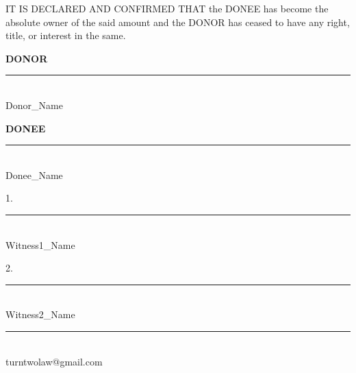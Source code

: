 \documentclass[12pt]{article}
\begin{document}
\vspace{0.7em}
\noindent
{\large IT IS DECLARED AND CONFIRMED THAT the DONEE has become the absolute owner of the said amount and the DONOR has ceased to have any right, title, or interest in the same.}

\vspace{0.9em}

\vspace{1.8em}
\noindent
\begin{minipage}[t]{0.45\textwidth}
  {\large\bfseries DONOR}\\[2.0em]
  \rule{6cm}{0.8pt}\\
  {\large {{Donor_Name}}}
\end{minipage}
\hfill
\begin{minipage}[t]{0.45\textwidth}
  {\large\bfseries DONEE}\\[2.0em]
  \rule{6cm}{0.8pt}\\
  {\large {{Donee_Name}}}
\end{minipage}

\vspace{1.4em}

\vspace{0.5em}
\noindent
\begin{minipage}[t]{0.45\textwidth}
  {\large 1.}\\[1.8em]
  \rule{6cm}{0.8pt}\\
  {\large {{Witness1_Name}}}
\end{minipage}
\hfill
\begin{minipage}[t]{0.45\textwidth}
  {\large 2.}\\[1.8em]
  \rule{6cm}{0.8pt}\\
  {\large {{Witness2_Name}}}
\end{minipage}

\vfill
\noindent\rule{\textwidth}{1.1pt}

\vspace{0.32em}
\begin{flushright}
\hspace{0.25em}{\small\bfseries E-MAIL}\\[-0.1em]
{\small turntwolaw@gmail.com}
\end{flushright}
\end{document}
